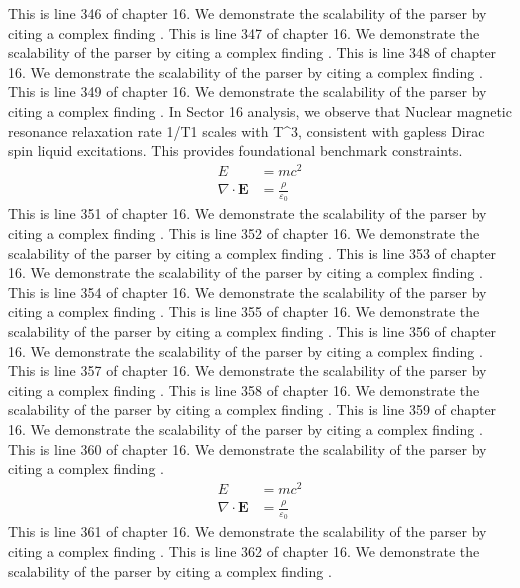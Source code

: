 This is line 346 of chapter 16. We demonstrate the scalability of the parser by citing a complex finding \cite{ref16_346}.
This is line 347 of chapter 16. We demonstrate the scalability of the parser by citing a complex finding \cite{ref16_347}.
This is line 348 of chapter 16. We demonstrate the scalability of the parser by citing a complex finding \cite{ref16_348}.
This is line 349 of chapter 16. We demonstrate the scalability of the parser by citing a complex finding \cite{ref16_349}.
In Sector 16 analysis, we observe that Nuclear magnetic resonance relaxation rate 1/T1 scales with T^3, consistent with gapless Dirac spin liquid excitations. This provides foundational benchmark constraints.
\begin{align*}
  E &= mc^2 \\
  \nabla \cdot \mathbf{E} &= \frac{\rho}{\varepsilon_0}
\end{align*}
This is line 351 of chapter 16. We demonstrate the scalability of the parser by citing a complex finding \cite{ref16_351}.
This is line 352 of chapter 16. We demonstrate the scalability of the parser by citing a complex finding \cite{ref16_352}.
This is line 353 of chapter 16. We demonstrate the scalability of the parser by citing a complex finding \cite{ref16_353}.
This is line 354 of chapter 16. We demonstrate the scalability of the parser by citing a complex finding \cite{ref16_354}.
This is line 355 of chapter 16. We demonstrate the scalability of the parser by citing a complex finding \cite{ref16_355}.
This is line 356 of chapter 16. We demonstrate the scalability of the parser by citing a complex finding \cite{ref16_356}.
This is line 357 of chapter 16. We demonstrate the scalability of the parser by citing a complex finding \cite{ref16_357}.
This is line 358 of chapter 16. We demonstrate the scalability of the parser by citing a complex finding \cite{ref16_358}.
This is line 359 of chapter 16. We demonstrate the scalability of the parser by citing a complex finding \cite{ref16_359}.
This is line 360 of chapter 16. We demonstrate the scalability of the parser by citing a complex finding \cite{ref16_360}.
\begin{align*}
  E &= mc^2 \\
  \nabla \cdot \mathbf{E} &= \frac{\rho}{\varepsilon_0}
\end{align*}
This is line 361 of chapter 16. We demonstrate the scalability of the parser by citing a complex finding \cite{ref16_361}.
This is line 362 of chapter 16. We demonstrate the scalability of the parser by citing a complex finding \cite{ref16_362}.
